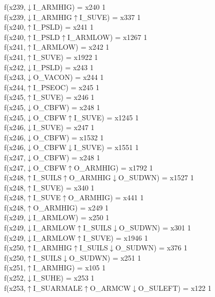 f(x239,$\downarrow$I\_ARMHIG) = x240 {1} \\
f(x239,$\downarrow$I\_ARMHIG$\uparrow$I\_SUVE) = x337 {1} \\
f(x240,$\uparrow$I\_PSLD) = x241 {1} \\
f(x240,$\uparrow$I\_PSLD$\uparrow$I\_ARMLOW) = x1267 {1} \\
f(x241,$\uparrow$I\_ARMLOW) = x242 {1} \\
f(x241,$\uparrow$I\_SUVE) = x1922 {1} \\
f(x242,$\downarrow$I\_PSLD) = x243 {1} \\
f(x243,$\downarrow$O\_VACON) = x244 {1} \\
f(x244,$\uparrow$I\_PSEOC) = x245 {1} \\
f(x245,$\uparrow$I\_SUVE) = x246 {1} \\
f(x245,$\downarrow$O\_CBFW) = x248 {1} \\
f(x245,$\downarrow$O\_CBFW$\uparrow$I\_SUVE) = x1245 {1} \\
f(x246,$\downarrow$I\_SUVE) = x247 {1} \\
f(x246,$\downarrow$O\_CBFW) = x1532 {1} \\
f(x246,$\downarrow$O\_CBFW$\downarrow$I\_SUVE) = x1551 {1} \\
f(x247,$\downarrow$O\_CBFW) = x248 {1} \\
f(x247,$\downarrow$O\_CBFW$\uparrow$O\_ARMHIG) = x1792 {1} \\
f(x248,$\uparrow$I\_SUILS$\uparrow$O\_ARMHIG$\downarrow$O\_SUDWN) = x1527 {1} \\
f(x248,$\uparrow$I\_SUVE) = x340 {1} \\
f(x248,$\uparrow$I\_SUVE$\uparrow$O\_ARMHIG) = x441 {1} \\
f(x248,$\uparrow$O\_ARMHIG) = x249 {1} \\
f(x249,$\downarrow$I\_ARMLOW) = x250 {1} \\
f(x249,$\downarrow$I\_ARMLOW$\uparrow$I\_SUILS$\downarrow$O\_SUDWN) = x301 {1} \\
f(x249,$\downarrow$I\_ARMLOW$\uparrow$I\_SUVE) = x1946 {1} \\
f(x250,$\uparrow$I\_ARMHIG$\uparrow$I\_SUILS$\downarrow$O\_SUDWN) = x376 {1} \\
f(x250,$\uparrow$I\_SUILS$\downarrow$O\_SUDWN) = x251 {1} \\
f(x251,$\uparrow$I\_ARMHIG) = x105 {1} \\
f(x252,$\downarrow$I\_SUHE) = x253 {1} \\
f(x253,$\uparrow$I\_SUARMALE$\uparrow$O\_ARMCW$\downarrow$O\_SULEFT) = x122 {1} \\
